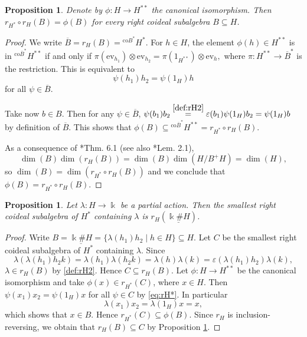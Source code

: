 \documentclass[reqno]{amsart}
\newtheorem{prop}[thm]{Proposition}
\theoremstyle{definition}
\numberwithin{equation}{section}\theoremstyle{plain}
\theoremstyle{definition}
\def \k {\Bbbk}
\begin{document}
    \begin{prop}
    \label{prop:rHbij}
        Denote by \(\phi : H \to H^{**}\) the canonical isomorphism. Then \(r_{H^*} \circ r_H(B) = \phi(B)\) for every right coideal subalgebra \(B \subseteq H\).
    \end{prop}
    \begin{proof}
        We write \(\overline{B} = r_H(B) = {^{\mathrm{co} B^*}} H^*\). 
        For \(h \in H\), the element \(\phi(h) \in H^{**}\) is in \({^{\mathrm{co} \overline{B}^*}} H^{**}\) if and only if 
        \(\pi(\mathrm{ev}_{h_{1}}) \otimes \mathrm{ev}_{h_2} = \pi(1_{H^{**}}) \otimes \mathrm{ev}_h,\)
        where \(\pi : H^{**} \to \overline{B}^*\) is the restriction. This is equivalent to 
        \begin{equation}
            \label{eq:rH*}
            \psi(h_1) h_2 = \psi(1_H) h
        \end{equation}
        for all \(\psi \in \overline{B}\).

        
        Take now \(b \in B\). Then for any \(\psi \in \overline{B}\),
        \(\psi(b_1) b_2 \overset{\eqref{def:rH2}}{=} \varepsilon(b_1) \psi(1_H) b_2 = \psi(1_H) b\)
        by definition of \(\overline{B}\). This shows that \(\phi(B) \subseteq {^{\mathrm{co} \overline{B}^*}} H^{**} = r_{H^*} \circ r_H(B)\). 

        As a consequence of \cite{skryabin}*{Thm. 6.1} (see also \cite{shimizu}*{Lem. 2.1}), 
        \[\dim(B) \dim(r_H(B)) = \dim(B) \dim(H/B^+H) = \dim (H),\]
        so \(\dim(B) = \dim(r_{H^*} \circ r_H(B))\) and we conclude that \(\phi(B) = r_{H^*} \circ r_H(B)\).
    \end{proof}

    \begin{prop}
    \label{prop:smallest_rcs}
        Let \(\lambda : H \to \k\) be a partial action. Then the smallest right coideal subalgebra of \(H^*\) containing \(\lambda\) is \(r_H(\underline{\k \# H})\).
    \end{prop}
    \begin{proof}
        Write \(B = \underline{\k \# H} = \{\lambda(h_1) h_2 \mid h \in H\} \subseteq H\). Let \(C\) be the smallest right coideal subalgebra of \(H^*\) containing \(\lambda\). Since 
        \[\lambda(\lambda(h_1)h_2 k) = \lambda(h_1) \lambda(h_2k) = \lambda(h) \lambda(k) = \varepsilon(\lambda(h_1) h_2) \lambda(k),\]
        \(\lambda \in r_H(B)\) by \eqref{def:rH2}. Hence \(C \subseteq r_H(B)\).
        Let \(\phi : H \to H^{**}\) be the canonical isomorphism and take \(\phi(x) \in r_{H^*}(C)\), where \(x \in H\). Then \(\psi(x_1) x_2 = \psi(1_H) x\) for all \(\psi \in C\) by \eqref{eq:rH*}. In particular
        \[\lambda(x_1) x_2 = \lambda(1_H) x = x,\]
        which shows that \(x \in B\). Hence \(r_{H^*}(C) \subseteq \phi(B)\). Since \(r_{H}\) is inclusion-reversing, we obtain that \(r_H(B) \subseteq C\) by Proposition \ref{prop:rHbij}.
    \end{proof}
\end{document}
